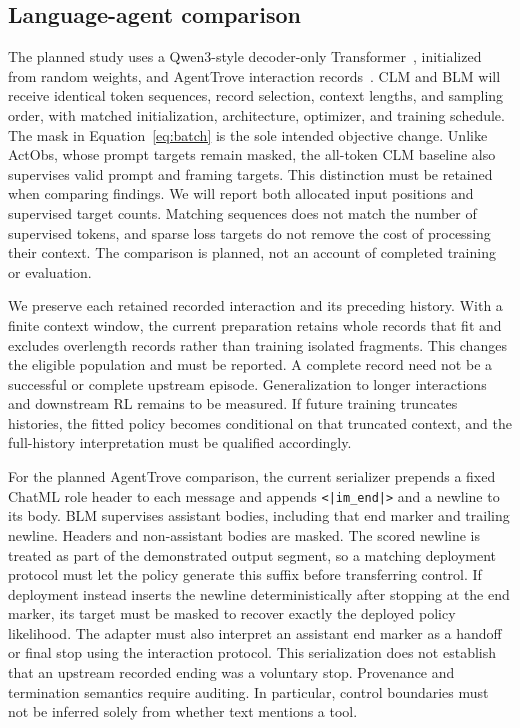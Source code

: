 \documentclass{article} %
\begin{document}
\subsection{Language-agent comparison}
The planned study uses a Qwen3-style decoder-only Transformer~\citep{yang2025qwen3}, initialized from random weights, and AgentTrove interaction records~\citep{openthoughts2026agenttrove}. CLM and BLM will receive identical token sequences, record selection, context lengths, and sampling order, with matched initialization, architecture, optimizer, and training schedule. The mask in Equation~\ref{eq:batch} is the sole intended objective change. Unlike ActObs, whose prompt targets remain masked, the all-token CLM baseline also supervises valid prompt and framing targets. This distinction must be retained when comparing findings. We will report both allocated input positions and supervised target counts. Matching sequences does not match the number of supervised tokens, and sparse loss targets do not remove the cost of processing their context. The comparison is planned, not an account of completed training or evaluation.

We preserve each retained recorded interaction and its preceding history. With a finite context window, the current preparation retains whole records that fit and excludes overlength records rather than training isolated fragments. This changes the eligible population and must be reported. A complete record need not be a successful or complete upstream episode. Generalization to longer interactions and downstream RL remains to be measured. If future training truncates histories, the fitted policy becomes conditional on that truncated context, and the full-history interpretation must be qualified accordingly.


For the planned AgentTrove comparison, the current serializer prepends a fixed ChatML role header to each message and appends \texttt{<|im\_end|>} and a newline to its body. BLM supervises assistant bodies, including that end marker and trailing newline. Headers and non-assistant bodies are masked. The scored newline is treated as part of the demonstrated output segment, so a matching deployment protocol must let the policy generate this suffix before transferring control. If deployment instead inserts the newline deterministically after stopping at the end marker, its target must be masked to recover exactly the deployed policy likelihood. The adapter must also interpret an assistant end marker as a handoff or final stop using the interaction protocol. This serialization does not establish that an upstream recorded ending was a voluntary stop. Provenance and termination semantics require auditing. In particular, control boundaries must not be inferred solely from whether text mentions a tool.
\end{document}
